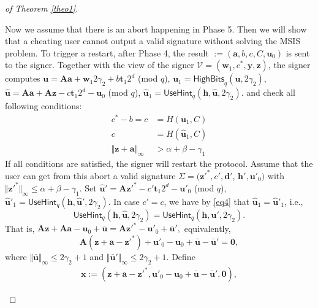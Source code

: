 \documentclass[conference]{IEEEtran}
\newtheorem{proof}{Proof}
\begin{document}
\begin{proof}[of Theorem \ref{theo1}]
\begin{enumerate}
			Now we assume that there is an abort happening in Phase 5. Then we will show that a cheating user cannot output a valid signature without solving the \textsf{MSIS} problem.   To trigger a restart, after Phase 4, the \textsf{result} $:= (\mathbf{a}, b, c, C, \mathbf{u}_0)$ is sent to the signer. Together with the view of the signer $\mathcal{V}=(\mathbf{w}_1,c^*,\mathbf{y}, \mathbf{z})$, the signer computes
			$\mathbf{u}=\mathbf{A}\mathbf{a}+\mathbf{w}_1 2\gamma_2+b\mathbf{t}_1 2^d$ (mod $q$), $\mathbf{u}_1=\textsf{HighBits}_q(\mathbf{u},2\gamma_2)$,  $\widehat{\mathbf{u}}=\mathbf{A}\mathbf{a}+\mathbf{A}\mathbf{z}-c\mathbf{t}_1 2^d-\mathbf{u}_0$ (mod $q$), 	$\widehat{\mathbf{u}}_1=\textsf{UseHint}_q(\mathbf{h},\widehat{\mathbf{u}}, 2\gamma_2)$. and check all following conditions:
			\begin{align}
			c^*-b=c&=H(\mathbf{u}_1,C)\label{eq3}\\
			c&=H(\widehat{\mathbf{u}}_1, C) \label{eq4}\\
			\Vert \mathbf{z}+\mathbf{a} \Vert_\infty &> \alpha+\beta-\gamma_1 \label{eq5}
			\end{align}
			If all conditions are satisfied, the signer will restart the protocol. Assume that the user can get from this abort  a valid signature $ \Sigma=(\mathbf{z}'^*, c', \mathbf{d}'$, $ \mathbf{h}', \mathbf{u}'_0)$ with $\Vert \mathbf{z}'^* \Vert_\infty \leq \alpha+\beta-\gamma_1$. Set $\widehat{\mathbf{u}}'=\mathbf{A}\mathbf{z}'^*-c'\mathbf{t}_1 2^d-\mathbf{u}'_0$ (mod $q$), 	$\widehat{\mathbf{u}}'_1=\textsf{UseHint}_q(\mathbf{h},\widehat{\mathbf{u}}', 2\gamma_2)$. 
			In case $c'=c$, we have by \eqref{eq4} that $\widehat{\mathbf{u}}_1=\widehat{\mathbf{u}}'_1$, i.e., 
			$$\textsf{UseHint}_q(\mathbf{h},\widehat{\mathbf{u}}, 2\gamma_2)=\textsf{UseHint}_q(\mathbf{h},\widehat{\mathbf{u}}', 2\gamma_2).$$
			That is,
			$
			\mathbf{A}\mathbf{z}+	\mathbf{A}\mathbf{a}-\mathbf{u}_{0}+\bar{\mathbf{u}} =\mathbf{A}\mathbf{z}'^*-\mathbf{u}'_{0}+\bar{\mathbf{u}}',
			$
			equivalently,
			\begin{equation*}\label{eq123}
			\mathbf{A}(\mathbf{z}+\mathbf{a}-\mathbf{z}'^*)+\mathbf{u}'_{0}-\mathbf{u}_{0}+\bar{\mathbf{u}}-\bar{\mathbf{u}}' =\textbf{0},
			\end{equation*}
			where $\Vert \bar{\mathbf{u}}\Vert_{\infty} \leq 2\gamma_2+1$ and $\Vert \bar{\mathbf{u}}'\Vert_{\infty} \leq 2\gamma_2+1$.
			Define 	\begin{align*}
			\mathbf{x}:=(\mathbf{z}+\mathbf{a}-\mathbf{z}'^*,\mathbf{u}'_{0}-\mathbf{u}_{0}+\bar{\mathbf{u}}-\bar{\mathbf{u}}', \textbf{0}),

\end{align*}
\end{enumerate}
\end{proof}
\end{document}
